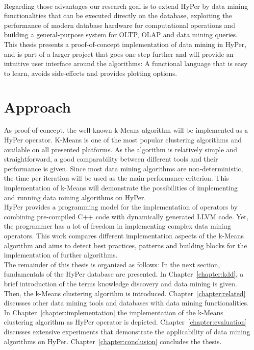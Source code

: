 \\
Regarding those advantages our research goal is to extend HyPer by data mining functionalities that can be executed directly on the database, exploiting the performance of modern database hardware for computational operations and building a general-purpose system for OLTP, OLAP and data mining queries. This thesis presents a proof-of-concept implementation of data mining in HyPer, and is part of a larger project that goes one step further and will provide an intuitive user interface around the algorithms: A functional language that is easy to learn, avoids side-effects and provides plotting options. 


\section{Approach}
As proof-of-concept, the well-known k-Means algorithm will be implemented as a HyPer operator. K-Means is one of the most popular  clustering algorithms and available on all presented platforms. As the algorithm is relatively simple and straightforward, a good comparability between different tools and their performance is given. Since most data mining algorithms are non-deterministic, the time per iteration will be used as the main performance criterion. This implementation of k-Means will demonstrate the possibilities of implementing and running data mining algorithms on HyPer.
\\
HyPer provides a programming model for the implementation of operators by combining pre-compiled C++ code with dynamically generated LLVM code. Yet, the programmer has a lot of freedom in implementing complex data mining operators. This work compares different implementation aspects of the k-Means algorithm and aims to detect best practices, patterns and building blocks for the implementation of further algorithms.
\\
The remainder of this thesis is organized as follows: In the next section, fundamentals of the HyPer database are presented. In Chapter~\ref{chapter:kdd}, a brief introduction of the terms knowledge discovery and data mining is given. Then, the k-Means clustering algorithm is introduced. Chapter~\ref{chapter:related} discusses other data mining tools and databases with data mining functionalities. In Chapter~\ref{chapter:implementation} the implementation of the k-Means clustering algorithm as HyPer operator is depicted. Chapter~\ref{chapter:evaluation} discusses extensive experiments that demonstrate the applicability of data mining algorithms on HyPer. Chapter~\ref{chapter:conclusion} concludes the thesis.




